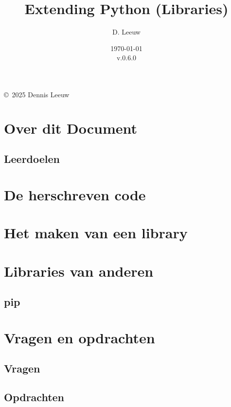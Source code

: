 \documentclass[a4paper,12pt,twoside,openright,titlepage]{book}
\author{D. Leeuw}
\title{Extending Python (Libraries)}
\date{\today\\v.0.6.0}
\begin{document}

\maketitle

\copyright\ 2025 Dennis Leeuw\\




\frontmatter
\chapter{Over dit Document}
\section{Leerdoelen}


\tableofcontents

\mainmatter

\chapter{De herschreven code}


\chapter{Het maken van een library}


\chapter{Libraries van anderen}

\section{pip}


\chapter{Vragen en opdrachten}
\section{Vragen}

\section{Opdrachten}


\printindex
\end{document}
